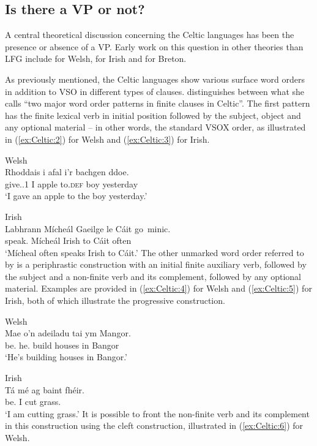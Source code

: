 \documentclass[output=paper,colorlinks,citecolor=brown]{langscibook}
\begin{document}
\subsection{Is there a VP or not?}
\label{sec:Celtic:2.2}

A central theoretical discussion concerning the Celtic languages has been the presence or absence of a VP. Early work on this question in other theories than LFG include \citet{Sproat} for Welsh, \citet{McCloskey1983} for Irish and \citet{AndersonChung1977} for Breton.

As previously mentioned, the Celtic languages show various surface word orders in addition to VSO in different types of clauses. \citet[22--23]{Tallerman1998} distinguishes between what she calls ``two major word order patterns in finite clauses in Celtic''. The first pattern has the finite lexical verb in initial position followed by the subject, object and any optional material -- in other words, the standard VSOX order, as illustrated in (\ref{ex:Celtic:2}) for Welsh and (\ref{ex:Celtic:3}) for Irish.

\ea\label{ex:Celtic:2} Welsh \citep[23]{Tallerman1998}\\
\gll Rhoddais  i afal i'r bachgen ddoe.\\
{give.\PST.1\SG} I apple to.\textsc{def} boy yesterday\\
\glt`I gave an apple to the boy yesterday.'
\z

\ea\label{ex:Celtic:3} Irish \citep[205]{OSiadhail1989}\\
\gll Labhrann Mícheál Gaeilge le Cáit go~minic.\\
{speak.\PRS} Mícheál Irish to Cáit often\\
\glt`Mícheal often speaks Irish to Cáit.'
\z
The other unmarked word order referred to by \citet[22--23]{Tallerman1998} is a periphrastic construction with an initial finite auxiliary verb, followed by the subject and a non-finite verb and its complement, followed by any optional material. Examples are provided in (\ref{ex:Celtic:4}) for Welsh and (\ref{ex:Celtic:5}) for Irish, both of which illustrate the progressive construction.

\ea\label{ex:Celtic:4} Welsh \citep[23]{Tallerman1998}\\
\gll Mae  o'n  adeiladu tai  ym Mangor.\\
{be.\PRS} {he.\PROG} build  houses in Bangor\\
\glt`He's building houses in Bangor.'
\z

\ea\label{ex:Celtic:5} Irish \citep[131]{MacEoin2002}\\
\gll Tá  m\'e ag  baint fh\'eir.\\
{be.\PRS} I {\PROG} cut grass.\GEN\\
\glt`I am cutting grass.'
\z
It is possible to front the non-finite verb and its complement in this construction using the cleft construction, illustrated in (\ref{ex:Celtic:6}) for Welsh.
\end{document}
